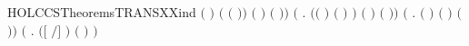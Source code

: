 \begin{SaveVerbatim}{HOLCCSTheoremsTRANSXXind}
              \ensuremath{(} \ensuremath{)}  \HOLSymConst{\HOLTokenConj{}}
              \ensuremath{(} \ensuremath{(} \ensuremath{)}\ensuremath{)}  \HOLSymConst{\HOLTokenImp{}}
             \ensuremath{(} \HOLSymConst{\ensuremath{\mid}} \ensuremath{)} \HOLConst{\ensuremath{\tau}} \ensuremath{(} \HOLSymConst{\ensuremath{\mid}} \ensuremath{)}\ensuremath{)} \HOLSymConst{\HOLTokenConj{}}
       \ensuremath{(}\HOLSymConst{\HOLTokenForall{}}    .
                \HOLSymConst{\HOLTokenConj{}}
            \ensuremath{(}\ensuremath{(} \HOLSymConst{\ensuremath{=}} \HOLConst{\ensuremath{\tau}}\ensuremath{)} \HOLSymConst{\HOLTokenDisj{}} \ensuremath{(} \HOLSymConst{\ensuremath{=}}  \ensuremath{)} \HOLSymConst{\HOLTokenConj{}}  \HOLConst{\HOLTokenNotIn{}}  \HOLSymConst{\HOLTokenConj{}}   \HOLConst{\HOLTokenNotIn{}} \ensuremath{)} \HOLSymConst{\HOLTokenImp{}}
             \ensuremath{(}  \ensuremath{)}  \ensuremath{(}  \ensuremath{)}\ensuremath{)} \HOLSymConst{\HOLTokenConj{}}
       \ensuremath{(}\HOLSymConst{\HOLTokenForall{}}   .
                \HOLSymConst{\HOLTokenImp{}}
             \ensuremath{(}  \ensuremath{)} \ensuremath{(}  \ensuremath{)} \ensuremath{(}  \ensuremath{)}\ensuremath{)} \HOLSymConst{\HOLTokenConj{}}
       \ensuremath{(}\HOLSymConst{\HOLTokenForall{}}   .
             \ensuremath{(}\ensuremath{[}  \ensuremath{/}\ensuremath{]} \ensuremath{)}   \HOLSymConst{\HOLTokenImp{}}  \ensuremath{(}  \ensuremath{)}  \ensuremath{)} \HOLSymConst{\HOLTokenImp{}}

\end{SaveVerbatim}
